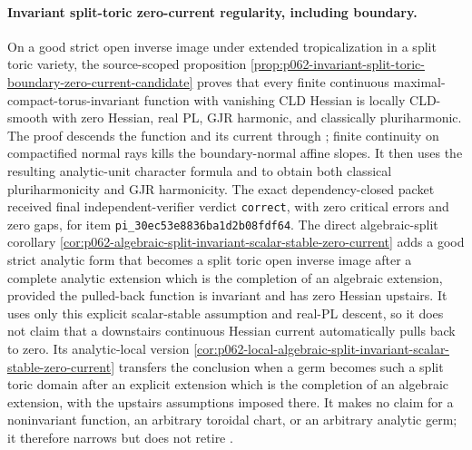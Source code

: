 \paragraph{Invariant split-toric zero-current regularity, including boundary.}
On a good strict open inverse image under extended tropicalization in a
split toric variety, the source-scoped proposition
\cref{prop:p062-invariant-split-toric-boundary-zero-current-candidate}
proves that every finite continuous maximal-compact-torus-invariant function
with vanishing CLD Hessian is locally CLD-smooth with zero Hessian, real PL,
GJR harmonic, and classically pluriharmonic.  The proof descends the function
and its current through \cite[(5.5) and Proposition~5.3.10(iv)]{BGJKK25};
finite continuity on compactified normal rays kills the boundary-normal
affine slopes.  It then uses the resulting analytic-unit character formula
and \cite[Proposition~4.2 and Theorem~4.3]{GR25Classical} to obtain both
classical pluriharmonicity and GJR harmonicity.  The exact dependency-closed
packet received final independent-verifier verdict \texttt{correct}, with
zero critical errors and zero gaps, for item
\texttt{pi\_30ec53e8836ba1d2b08fdf64}.  The direct algebraic-split corollary
\cref{cor:p062-algebraic-split-invariant-scalar-stable-zero-current} adds a
good strict analytic form that becomes a split toric open inverse image after
a complete analytic extension which is the completion of an algebraic
extension, provided the pulled-back function is invariant and has zero
Hessian upstairs.  It uses only this explicit scalar-stable assumption and
real-PL descent, so it does not claim that a downstairs continuous Hessian
current automatically pulls back to zero.  Its
analytic-local version
\cref{cor:p062-local-algebraic-split-invariant-scalar-stable-zero-current}
transfers the conclusion when a germ becomes such a split toric domain after
an explicit extension which is the completion of an algebraic extension, with
the upstairs assumptions imposed there.  It makes no claim for a noninvariant function, an arbitrary
toroidal chart, or an arbitrary analytic germ; it therefore narrows but does not retire
.

